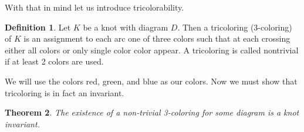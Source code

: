 \documentclass[12pt]{amsart}
\newtheorem{theorem}{Theorem}[section]
\theoremstyle{definition}
\newtheorem{definition}[theorem]{Definition}
\theoremstyle{remark}
\numberwithin{equation}{section}
\begin{document}
With that in mind let us introduce tricolorability.

\begin{definition}
  Let $K$ be a knot with diagram $D$. Then a tricoloring (3-coloring)
  of $K$ is an assignment to each arc one of three colors
  such that at each crossing either all colors or
  only single color color appear. A tricoloring is called nontrivial
  if at least 2 colors are used.
\end{definition}

We will use the colors red, green, and blue as our colors.
Now we must show that tricoloring is in fact an invariant.

\begin{theorem}
  The existence of a non-trivial 3-coloring for some diagram is a
  knot invariant.
\end{theorem}
\end{document}
